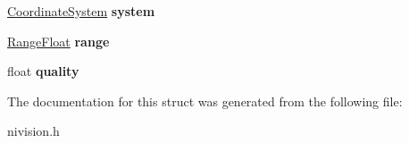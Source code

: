 \begin{DoxyCompactItemize}
\item 
\hypertarget{structCalibrationInfo__struct_a4eecaa8a65776d8bf955f557a09d555b}{\hyperlink{structCoordinateSystem__struct}{\-Coordinate\-System} {\bfseries system}}\label{structCalibrationInfo__struct_a4eecaa8a65776d8bf955f557a09d555b}

\item 
\hypertarget{structCalibrationInfo__struct_a111b3ba819c6af37f393334300bf3e8f}{\hyperlink{structRangeFloat__struct}{\-Range\-Float} {\bfseries range}}\label{structCalibrationInfo__struct_a111b3ba819c6af37f393334300bf3e8f}

\item 
\hypertarget{structCalibrationInfo__struct_a070499ef1cb26f1f6683b155d6ba46e8}{float {\bfseries quality}}\label{structCalibrationInfo__struct_a070499ef1cb26f1f6683b155d6ba46e8}

\end{DoxyCompactItemize}


\-The documentation for this struct was generated from the following file\-:\begin{DoxyCompactItemize}
\item 
nivision.\-h\end{DoxyCompactItemize}
